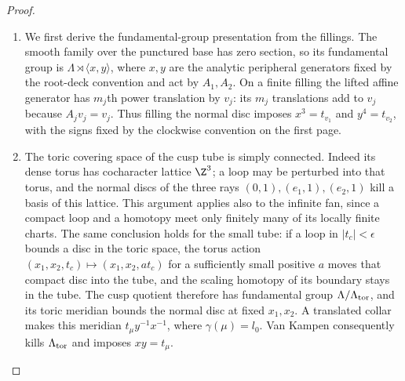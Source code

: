 \begin{proof}
\begin{enumerate}[label=\arabic*.,leftmargin=*]
\item We first derive the fundamental-group presentation from the fillings.
The smooth family over the punctured base has zero section, so its
fundamental group is $\Lambda\rtimes\langle x,y\rangle$, where
$x,y$ are the analytic peripheral generators fixed by the root-deck convention and act by $A_1,A_2$.
On a finite filling the lifted affine generator has $m_j$th power
translation by $v_j$: its $m_j$ translations add to $v_j$ because
$A_jv_j=v_j$. Thus filling the normal disc imposes
$x^3=t_{v_1}$ and $y^4=t_{v_2}$, with the signs fixed by the
clockwise convention on the first page.

\item The toric covering space of the cusp tube is simply connected.
Indeed its dense torus has cocharacter lattice $\Z^3$; a loop may
be perturbed into that torus, and the normal discs of the three rays
$(0,1),(e_1,1),(e_2,1)$ kill a basis of this lattice.
This argument applies also to the infinite fan, since a compact loop
and a homotopy meet only finitely many of its locally finite charts.
The same conclusion holds for the small tube: if a loop in
$|t_c|<\epsilon$ bounds a disc in the toric space, the torus action
$(x_1,x_2,t_c)\mapsto(x_1,x_2,a t_c)$ for a sufficiently small
positive $a$ moves that compact disc into the tube, and the scaling
homotopy of its boundary stays in the tube.
The cusp quotient therefore has fundamental group
$\Lambda/\Lambda_{\rm tor}$, and its toric meridian bounds the
normal disc at fixed $x_1,x_2$. A translated collar makes this
meridian $t_\mu y^{-1}x^{-1}$, where $\gamma(\mu)=l_0$.
Van Kampen consequently kills $\Lambda_{\rm tor}$ and imposes
$xy=t_\mu$.


\end{enumerate}
\end{proof}
